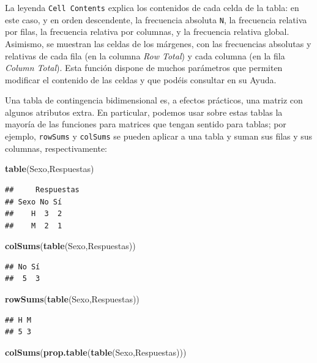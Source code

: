 \documentclass[]{book}
\newenvironment{Shaded}{\begin{snugshade}}{\end{snugshade}}
\newcommand{\KeywordTok}[1]{\textcolor[rgb]{0.13,0.29,0.53}{\textbf{#1}}}
\newcommand{\NormalTok}[1]{#1}
\theoremstyle{definition}
\theoremstyle{definition}
\theoremstyle{definition}
\theoremstyle{remark}
\begin{document}
La leyenda \texttt{Cell\ Contents} explica los contenidos de cada celda de la tabla: en este caso, y en orden descendente, la frecuencia absoluta \texttt{N}, la frecuencia relativa por filas, la frecuencia relativa por columnas, y la frecuencia relativa global. Asimismo, se muestran las celdas de los márgenes, con las frecuencias absolutas y relativas de cada fila (en la columna \emph{Row Total}) y cada columna (en la fila \emph{Column Total}). Esta función dispone de muchos parámetros que permiten modificar el contenido de las celdas y que podéis consultar en su Ayuda.

Una tabla de contingencia bidimensional es, a efectos prácticos, una matriz con algunos atributos extra. En particular, podemos usar sobre estas tablas la mayoría de las funciones para matrices que tengan sentido para tablas; por ejemplo, \texttt{rowSums} y \texttt{colSums} se pueden aplicar a una tabla y suman sus filas y sus columnas, respectivamente:

\begin{Shaded}
\begin{Highlighting}[]
\KeywordTok{table}\NormalTok{(Sexo,Respuestas)}
\end{Highlighting}
\end{Shaded}

\begin{verbatim}
##     Respuestas
## Sexo No Sí
##    H  3  2
##    M  2  1
\end{verbatim}

\begin{Shaded}
\begin{Highlighting}[]
\KeywordTok{colSums}\NormalTok{(}\KeywordTok{table}\NormalTok{(Sexo,Respuestas))}
\end{Highlighting}
\end{Shaded}

\begin{verbatim}
## No Sí 
##  5  3
\end{verbatim}

\begin{Shaded}
\begin{Highlighting}[]
\KeywordTok{rowSums}\NormalTok{(}\KeywordTok{table}\NormalTok{(Sexo,Respuestas))}
\end{Highlighting}
\end{Shaded}

\begin{verbatim}
## H M 
## 5 3
\end{verbatim}

\begin{Shaded}
\begin{Highlighting}[]
\KeywordTok{colSums}\NormalTok{(}\KeywordTok{prop.table}\NormalTok{(}\KeywordTok{table}\NormalTok{(Sexo,Respuestas)))}
\end{Highlighting}
\end{Shaded}
\end{document}
